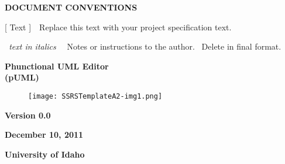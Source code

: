 \documentclass[twoside,letterpaper]{article}
\begin{document}
\bigskip


\bigskip

{\centering{}\bfseries\color{black}
DOCUMENT CONVENTIONS
\par}


\bigskip

{\color{black}
[ Text ]\ \ Replace this text with your project specification text.}


\bigskip

{\color{black}
\foreignlanguage{english}{\textit{\ }}\foreignlanguage{english}{\textit{text
in italics }}\foreignlanguage{english}{\ \ Notes or instructions to the
author. \ Delete in final format.}}


\bigskip


\bigskip




\bigskip

{\centering{}\bfseries\color{black}
Phunctional UML Editor
\\(pUML)
\par}


\bigskip


\bigskip


\bigskip

\begin{figure}
\centering
\texttt{[image: SSRSTemplateA2-img1.png]}
\end{figure}

\bigskip


\bigskip

{\centering{}\bfseries\color{black}
Version 0.0
\par}

{\centering{}\bfseries\color{black}
December 10, 2011
\par}


\bigskip


\bigskip

{\centering{}\bfseries\color{black}
University of Idaho
\par}

{\centering{}\bfseries\color{black}

\par}
\end{document}
